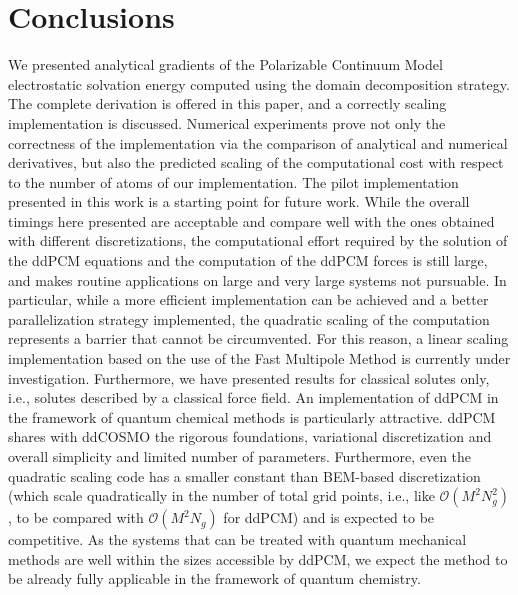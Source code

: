 \section{Conclusions}\label{sec:conclusions}
We presented analytical gradients of the Polarizable Continuum Model electrostatic solvation energy computed using the domain decomposition strategy. The complete derivation is offered in this paper, and a correctly scaling implementation is discussed. Numerical experiments prove not only the correctness of the implementation via the comparison of analytical and numerical derivatives, but also the predicted scaling of the computational cost with respect to the number of atoms of our implementation.
The pilot implementation presented in this work is a starting point for future work. While the overall timings here presented are acceptable and compare well with the ones obtained with different discretizations, the computational effort required by the solution of the ddPCM equations and the computation of the ddPCM forces is still large, and makes routine applications on large and very large systems not pursuable. In particular, while a more efficient implementation can be achieved and a better parallelization strategy implemented, the quadratic scaling of the computation represents a barrier that cannot be circumvented. For this reason, a linear scaling implementation based on the use of the Fast Multipole Method is currently under investigation. Furthermore, we have presented results for classical solutes only, i.e., solutes described by a classical force field. An implementation of ddPCM in the framework of quantum chemical methods is particularly attractive. ddPCM shares with ddCOSMO the rigorous foundations, variational discretization and overall simplicity and limited number of parameters. Furthermore, even the quadratic scaling code has a smaller constant than BEM-based discretization (which scale quadratically in the number of total grid points, i.e., like $\mathcal{O}(M^2N^2_g)$, to be compared with $\mathcal{O}(M^2N_g)$ for ddPCM) and is expected to be competitive. As the systems that can be treated with quantum mechanical methods are well within the sizes accessible by ddPCM, we expect the method to be already fully applicable in the framework of quantum chemistry. 
